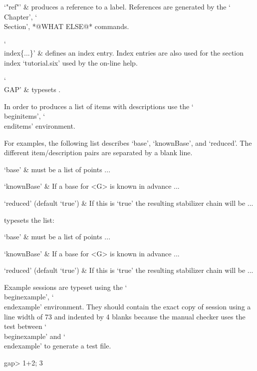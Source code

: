 `"ref"' &
    produces  a reference  to a  label.  References  are generated by the
    `\\Chapter', `\\Section', *@WHAT ELSE@* commands.

`\\index\{...\}' &
    defines an index entry.  Index entries are  also used for the section
    index `tutorial.six' used by the on-line help.

`\\GAP' &
    typesets {\GAP}.

\enditems


In order  to   produces a  list   of  items with   descriptions  use  the
`\\beginitems', `\\enditems' environment.

For examples, the   following  list describes   `base', `knownBase',  and
`reduced'.  The different item/description pairs are separated by a blank
line.

\begintt
  \beginitems
    `base' &
        must be a  list of points ...

    `knownBase' &
        If a base for <G> is known in advance ...

    `reduced' (default `true') &
        If this is `true' the resulting stabilizer chain will be ...
  \enditems
\endtt

typesets the list:

\beginitems
  `base' &
      must be a  list of points ...

  `knownBase' &
      If a base for <G> is known in advance ...

  `reduced' (default `true') &
      If this is `true' the resulting stabilizer chain will be ...
\enditems

Example   {\GAP}  sessions  are    typeset  using the   `\\beginexample',
`\\endexample' environment.   They  should contain   the   exact  copy of
{\GAP} session using a line width of 73 and  indented by 4 blanks because
the   manual  checker  uses    the  test  between   `\\beginexample'  and
`\\endexample' to generate a test file.

\begintt
  \beginexample
      gap> 1+2;
      3
  \endexample
\endtt

